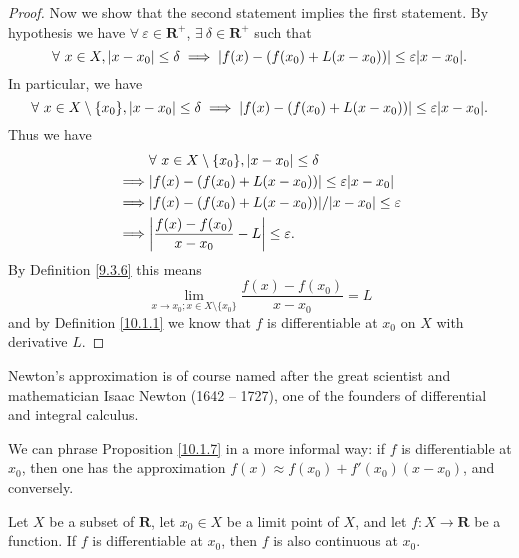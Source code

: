 \begin{proof}
    Now we show that the second statement implies the first statement.
    By hypothesis we have \(\forall\ \varepsilon \in \mathbf{R}^+\), \(\exists\ \delta \in \mathbf{R}^+\) such that
    \[
        \forall\ x \in X, \abs*{x - x_0} \leq \delta \implies \abs*{f(x) - (f(x_0) + L(x - x_0))} \leq \varepsilon \abs*{x - x_0}.
    \]
    In particular, we have
    \[
        \forall\ x \in X \setminus \{x_0\}, \abs*{x - x_0} \leq \delta \implies \abs*{f(x) - (f(x_0) + L(x - x_0))} \leq \varepsilon \abs*{x - x_0}.
    \]
    Thus we have
    \begin{align*}
                 & \forall\ x \in X \setminus \{x_0\}, \abs*{x - x_0} \leq \delta        \\
        \implies & \abs*{f(x) - (f(x_0) + L(x - x_0))} \leq \varepsilon \abs*{x - x_0}   \\
        \implies & \abs*{f(x) - (f(x_0) + L(x - x_0))} / \abs*{x - x_0} \leq \varepsilon \\
        \implies & \abs*{\frac{f(x) - f(x_0)}{x - x_0} - L} \leq \varepsilon.
    \end{align*}
    By Definition \ref{9.3.6} this means
    \[
        \lim_{x \to x_0 ; x \in X \setminus \{x_0\}} \frac{f(x) - f(x_0)}{x - x_0} = L
    \]
    and by Definition \ref{10.1.1} we know that \(f\) is differentiable at \(x_0\) on \(X\) with derivative \(L\).
\end{proof}

\begin{remark}\label{10.1.8}
    Newton's approximation is of course named after the great scientist and mathematician Isaac Newton (1642 -- 1727), one of the founders of differential and integral calculus.
\end{remark}

\begin{remark}\label{10.1.9}
    We can phrase Proposition \ref{10.1.7} in a more informal way:
    if \(f\) is differentiable at \(x_0\), then one has the approximation \(f(x) \approx f(x_0) + f'(x_0)(x - x_0)\), and conversely.
\end{remark}

\begin{proposition}\label{10.1.10}
    Let \(X\) be a subset of \(\mathbf{R}\), let \(x_0 \in X\) be a limit point of \(X\), and let \(f : X \to \mathbf{R}\) be a function.
    If \(f\) is differentiable at \(x_0\), then \(f\) is also continuous at \(x_0\).
\end{proposition}

